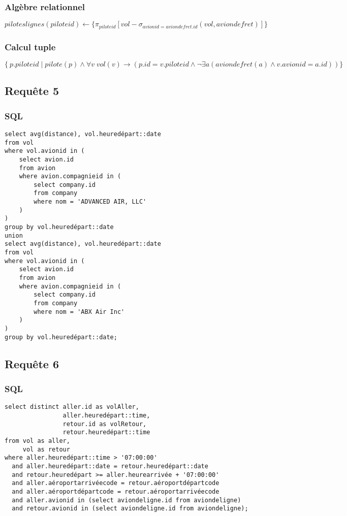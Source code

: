 \documentclass[french, utf8]{article}
\begin{document}
\subsubsection{Algèbre relationnel}
\[piloteslignes(piloteid) \xleftarrow{} \{\pi_{piloteid} [vol - \sigma_{avionid=aviondefret.id}(vol, aviondefret)]\} \]
\subsubsection{Calcul tuple}
\[\{\ p.piloteid\; | \;pilote(p) \wedge  \forall v\;vol(v) \xrightarrow{} ( p.id = v.piloteid \wedge \lnot \exists a(aviondefret(a) \wedge v.avionid = a.id)) \}\]
\newline
\newpage

\subsection{Requête 5}
\subsubsection{SQL}
\begin{verbatim}
select avg(distance), vol.heuredépart::date
from vol
where vol.avionid in (
    select avion.id
    from avion
    where avion.compagnieid in (
        select company.id
        from company
        where nom = 'ADVANCED AIR, LLC'
    )
)
group by vol.heuredépart::date
union
select avg(distance), vol.heuredépart::date
from vol
where vol.avionid in (
    select avion.id
    from avion
    where avion.compagnieid in (
        select company.id
        from company
        where nom = 'ABX Air Inc'
    )
)
group by vol.heuredépart::date;
\end{verbatim}
\newpage


\subsection{Requête 6}
\subsubsection{SQL}
\begin{verbatim}
select distinct aller.id as volAller,
                aller.heuredépart::time,
                retour.id as volRetour,
                retour.heuredépart::time
from vol as aller,
     vol as retour
where aller.heuredépart::time > '07:00:00'
  and aller.heuredépart::date = retour.heuredépart::date
  and retour.heuredépart >= aller.heurearrivée + '07:00:00'
  and aller.aéroportarrivéecode = retour.aéroportdépartcode
  and aller.aéroportdépartcode = retour.aéroportarrivéecode
  and aller.avionid in (select aviondeligne.id from aviondeligne)
  and retour.avionid in (select aviondeligne.id from aviondeligne);
\end{verbatim}
\newpage
\end{document}
